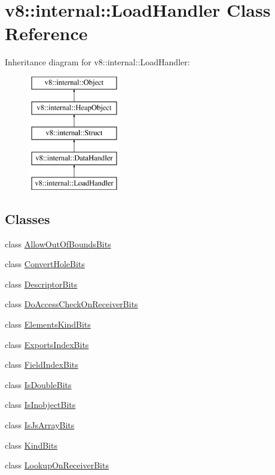 \hypertarget{classv8_1_1internal_1_1LoadHandler}{}\section{v8\+:\+:internal\+:\+:Load\+Handler Class Reference}
\label{classv8_1_1internal_1_1LoadHandler}
Inheritance diagram for v8\+:\+:internal\+:\+:Load\+Handler\+:\begin{figure}[H]
\begin{center}
\leavevmode
\includegraphics[height=5.000000cm]{classv8_1_1internal_1_1LoadHandler}
\end{center}
\end{figure}
\subsection*{Classes}
\begin{DoxyCompactItemize}
\item 
class \mbox{\hyperlink{classv8_1_1internal_1_1LoadHandler_1_1AllowOutOfBoundsBits}{Allow\+Out\+Of\+Bounds\+Bits}}
\item 
class \mbox{\hyperlink{classv8_1_1internal_1_1LoadHandler_1_1ConvertHoleBits}{Convert\+Hole\+Bits}}
\item 
class \mbox{\hyperlink{classv8_1_1internal_1_1LoadHandler_1_1DescriptorBits}{Descriptor\+Bits}}
\item 
class \mbox{\hyperlink{classv8_1_1internal_1_1LoadHandler_1_1DoAccessCheckOnReceiverBits}{Do\+Access\+Check\+On\+Receiver\+Bits}}
\item 
class \mbox{\hyperlink{classv8_1_1internal_1_1LoadHandler_1_1ElementsKindBits}{Elements\+Kind\+Bits}}
\item 
class \mbox{\hyperlink{classv8_1_1internal_1_1LoadHandler_1_1ExportsIndexBits}{Exports\+Index\+Bits}}
\item 
class \mbox{\hyperlink{classv8_1_1internal_1_1LoadHandler_1_1FieldIndexBits}{Field\+Index\+Bits}}
\item 
class \mbox{\hyperlink{classv8_1_1internal_1_1LoadHandler_1_1IsDoubleBits}{Is\+Double\+Bits}}
\item 
class \mbox{\hyperlink{classv8_1_1internal_1_1LoadHandler_1_1IsInobjectBits}{Is\+Inobject\+Bits}}
\item 
class \mbox{\hyperlink{classv8_1_1internal_1_1LoadHandler_1_1IsJsArrayBits}{Is\+Js\+Array\+Bits}}
\item 
class \mbox{\hyperlink{classv8_1_1internal_1_1LoadHandler_1_1KindBits}{Kind\+Bits}}
\item 
class \mbox{\hyperlink{classv8_1_1internal_1_1LoadHandler_1_1LookupOnReceiverBits}{Lookup\+On\+Receiver\+Bits}}
\end{DoxyCompactItemize}
